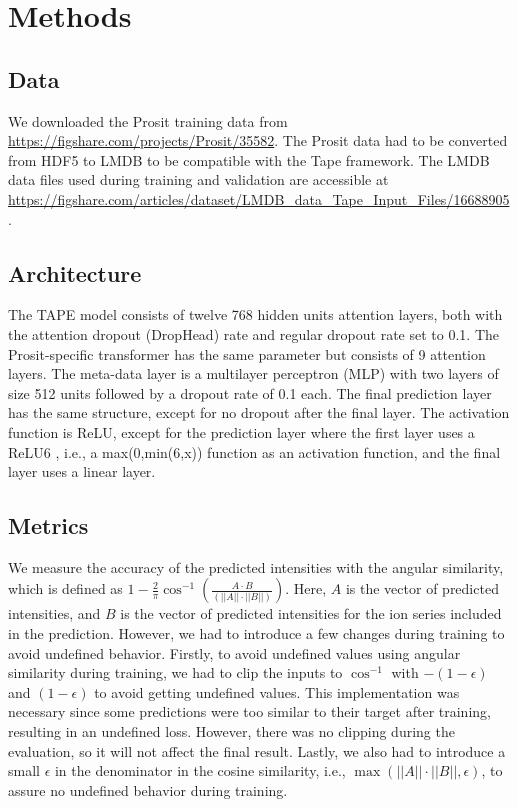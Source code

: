 \documentclass[10pt,a4paper]{article}
\begin{document}
\section*{Methods}
\subsection*{Data}
We downloaded the Prosit training data from \url{https://figshare.com/projects/Prosit/35582}. The Prosit data had to be converted from HDF5 to LMDB to be compatible with the Tape framework. The LMDB data files used during training and validation are accessible at \url{https://figshare.com/articles/dataset/LMDB_data_Tape_Input_Files/16688905}.

\subsection*{Architecture}

The TAPE model consists of twelve 768 hidden units attention layers, both with the attention dropout (DropHead) rate \cite{Zhou2020-ji} and regular dropout rate set to 0.1. The Prosit-specific transformer has the same parameter but consists of 9 attention layers. The meta-data layer is a multilayer perceptron (MLP) with two layers of size 512 units followed by a dropout rate of 0.1 each. The final prediction layer has the same structure, except for no dropout after the final layer.  The activation function is ReLU, except for the prediction layer where the first layer uses a ReLU6 \cite{Howard2017-yv}, i.e., a max(0,min(6,x)) function as an activation function, and the final layer uses a linear layer.

\subsection*{Metrics}

We measure the accuracy of the predicted intensities with the angular similarity, which is defined as $1-\frac{2}{\pi} \cos^{-1}\left(\frac{A \cdot B}{(||A||\cdot||B||)}\right)$. Here, $A$ is the vector of predicted intensities, and $B$ is the vector of predicted intensities for the ion series included in the prediction. However, we had to introduce a few changes during training to avoid undefined behavior. Firstly, to avoid undefined values using angular similarity during training, we had to clip the inputs to $\cos^{-1}$ with $-(1-\epsilon)$ and $(1-\epsilon)$ to avoid getting undefined values. This implementation was necessary since some predictions were too similar to their target after training, resulting in an undefined loss. However, there was no clipping during the evaluation, so it will not affect the final result. Lastly, we also had to introduce a small $\epsilon$ in the denominator in the cosine similarity, i.e., $\max(||A||·||B||, \epsilon)$, to assure no undefined behavior during training.
\end{document}
